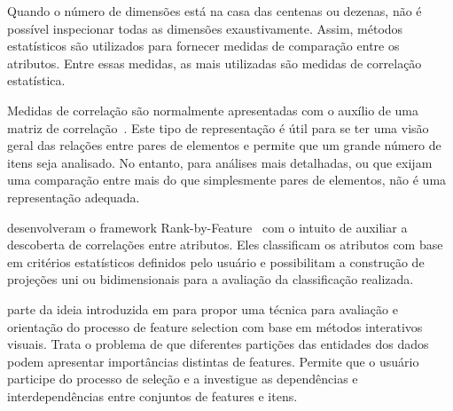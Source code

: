 

Quando o número de dimensões está na casa das centenas ou dezenas, não é possível inspecionar todas as dimensões exaustivamente. Assim, métodos estatísticos são utilizados para fornecer medidas de comparação entre os atributos. Entre essas medidas, as mais utilizadas são medidas de correlação estatística.

Medidas de correlação são normalmente apresentadas com o auxílio de uma matriz de correlação~\cite{Friendly2002}. Este tipo de representação é útil para se ter uma visão geral das relações entre pares de elementos e permite que um grande número de itens seja analisado. No entanto, para análises mais detalhadas, ou que exijam uma comparação entre mais do que simplesmente pares de elementos, não é uma representação adequada.


\citeauthor{Shneiderman2004} desenvolveram o framework Rank-by-Feature~\cite{Shneiderman2004} com o intuito de auxiliar a descoberta de correlações entre atributos. Eles classificam os atributos com base em critérios estatísticos definidos pelo usuário e possibilitam a construção de projeções uni ou bidimensionais para a avaliação da classificação realizada. 



\cite{May2011} parte da ideia introduzida em \cite{May2011ss} para propor uma técnica para avaliação e orientação do processo de feature selection com base em métodos interativos visuais. Trata o problema de que diferentes partições das entidades dos dados podem apresentar  importâncias distintas de features. Permite que o usuário participe do processo de seleção e a investigue as dependências e interdependências entre conjuntos de features e itens.


